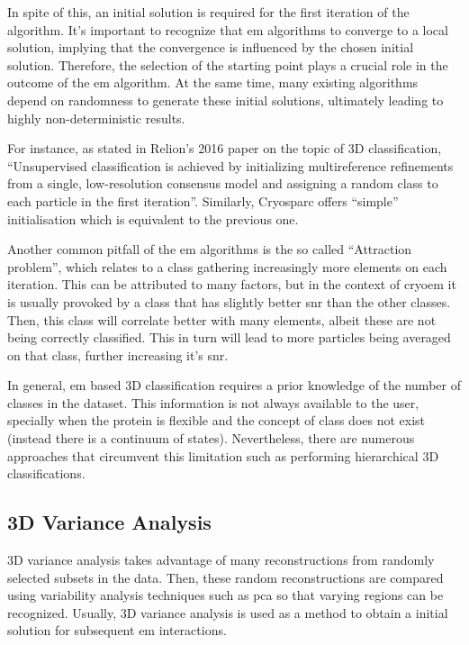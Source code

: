 \documentclass[../main.tex]{subfiles}
\begin{document}
In spite of this, an initial solution is required for the first iteration of the algorithm. It's important to recognize that \gls{em} algorithms to converge to a local solution\cite{meng1997}, implying that the convergence is influenced by the chosen initial solution\cite{sorzano2022}\cite{jonic2016}. Therefore, the selection of the starting point plays a crucial role in the outcome of the \gls{em} algorithm. At the same time, many existing algorithms depend on randomness to generate these initial solutions, ultimately leading to highly non-deterministic results.

For instance, as stated in Relion's 2016 paper on the topic of 3D classification, ``Unsupervised classification is achieved by initializing multireference refinements from a single, low-resolution consensus model and assigning a random class to each particle in the first iteration''\cite{scheres2016}.  Similarly, Cryosparc offers ``simple'' initialisation which is equivalent to the previous one. 

Another common pitfall of the \gls{em} algorithms is the so called ``Attraction problem'', which relates to a class gathering increasingly more elements on each iteration\cite{sorzano2022}\cite{gomezblanco2022}. This can be attributed to many factors, but in the context of \gls{cryoem} it is usually provoked by a class that has slightly better \gls{snr} than the other classes. Then, this class will correlate better with many elements\cite{sorzano2010}\cite{jonic2016}, albeit these are not being correctly classified. This in turn will lead to more particles being averaged on that class, further increasing it's \gls{snr}\cite{sorzano2021}.

In general, \gls{em} based 3D classification requires a prior knowledge of the number of classes in the dataset\cite{jonic2016}. This information is not always available to the user, specially when the protein is flexible and the concept of class does not exist (instead there is a continuum of states). Nevertheless, there are numerous approaches that circumvent this limitation such as performing hierarchical 3D classifications\cite{gomezblanco2022}\cite{zhou2022}.

\subsection{3D Variance Analysis}
3D variance analysis takes advantage of many reconstructions from randomly selected subsets in the data. Then, these random reconstructions are compared using variability analysis techniques such as \gls{pca} so that varying regions can be recognized\cite{penczek2006}. Usually, 3D variance analysis is used as a method to obtain a initial solution for subsequent \gls{em} interactions. 
\end{document}
